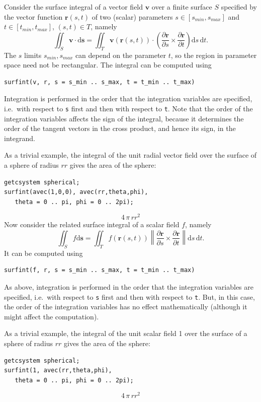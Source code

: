 Consider the surface integral of a vector field $\mathbf{v}$ over a
finite surface $S$ specified by the vector function $\mathbf{r}(s,t)$
of two (scalar) parameters $s \in [s_\mathit{min},s_\mathit{max}]$ and
$t \in [t_\mathit{min},t_\mathit{max}]$, $(s,t)\in T$, namely
\[
\iint_S\mathbf{v} \cdot \mathrm{d}\mathbf{s} =
\iint_T\mathbf{v}(\mathbf{r}(s,t))\cdot
\left(\frac{\partial\mathbf{r}}{\partial{s}} \times
\frac{\partial\mathbf{r}}{\partial{t}}\right)
\mathrm{d}s\,\mathrm{d}t.
\]
The $s$ limits $s_\mathit{min},s_\mathit{max}$ can depend on the
parameter $t$, so the region in parameter space need not be
rectangular.  The integral can be computed using
\begin{verbatim}
surfint(v, r, s = s_min .. s_max, t = t_min .. t_max)
\end{verbatim}
Integration is performed in the order that the integration variables
are specified, i.e.\ with respect to \texttt{s} first and then with
respect to \texttt{t}.  Note that the order of the integration
variables affects the sign of the integral, because it determines the
order of the tangent vectors in the cross product, and hence its sign,
in the integrand.

\example{}

As a trivial example, the integral of the unit radial vector field
over the surface of a sphere of radius $\mathit{rr}$ gives the area of
the sphere:
\begin{verbatim}
getcsystem spherical;
surfint(avec(1,0,0), avec(rr,theta,phi),
   theta = 0 .. pi, phi = 0 .. 2pi);
\end{verbatim}
\[ 4\,\pi\,rr^2 \]
Now consider the related surface integral of a scalar field $f$,
namely
\[
\iint_Sf\mathrm{d}\mathbf{s}=
\iint_Tf(\mathbf{r}(s,t))
\left\|\frac{\partial\mathbf{r}}{\partial{s}} \times
\frac{\partial\mathbf{r}}{\partial{t}}\right\|
\mathrm{d}s\,\mathrm{d}t.
\]
It can be computed using
\begin{verbatim}
surfint(f, r, s = s_min .. s_max, t = t_min .. t_max)
\end{verbatim}
As above, integration is performed in the order that the integration
variables are specified, i.e.\ with respect to \texttt{s} first and
then with respect to \texttt{t}.  But, in this case, the order of the
integration variables has no effect mathematically (although it might
affect the computation).

\example{}

As a trivial example, the integral of the unit scalar field 1 over the
surface of a sphere of radius $\mathit{rr}$ gives the area of the
sphere:
\begin{verbatim}
getcsystem spherical;
surfint(1, avec(rr,theta,phi),
   theta = 0 .. pi, phi = 0 .. 2pi);
\end{verbatim}
\[ 4\,\pi\,rr^2 \]

